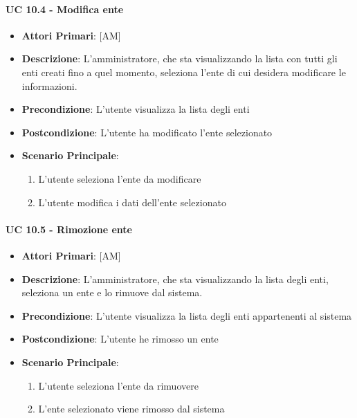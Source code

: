 			\paragraph{UC 10.4 - Modifica ente}
			\begin{itemize}
				\item \textbf{Attori Primari}: [AM]
				\item \textbf{Descrizione}: L'amministratore, che sta visualizzando la lista con tutti gli enti creati fino a quel momento, seleziona l'ente di cui desidera modificare le informazioni. 
				\item \textbf{Precondizione}: L'utente visualizza la lista degli enti
				\item \textbf{Postcondizione}: L'utente ha modificato l'ente selezionato
				\item \textbf{Scenario Principale}:
				\begin{enumerate}
					\item{L'utente seleziona l'ente da modificare}
					\item{L'utente modifica i dati dell'ente selezionato}
				\end{enumerate}
			\end{itemize}	

			\paragraph{UC 10.5 - Rimozione ente}
			\begin{itemize}
				\item \textbf{Attori Primari}: [AM]
				\item \textbf{Descrizione}: L'amministratore, che sta visualizzando la lista degli enti, seleziona un ente e lo rimuove dal sistema.
				\item \textbf{Precondizione}: L'utente visualizza la lista degli enti appartenenti al sistema
				\item \textbf{Postcondizione}: L'utente he rimosso un ente
				\item \textbf{Scenario Principale}:
				\begin{enumerate}
					\item{L'utente seleziona l'ente da rimuovere}
					\item{L'ente selezionato viene rimosso dal sistema}
				\end{enumerate}	
			\end{itemize}		